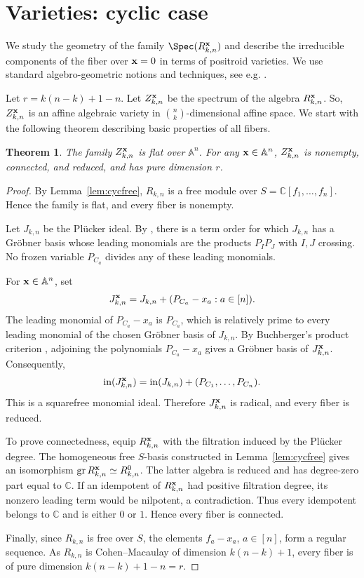 \documentclass[11pt]{amsart}
\numberwithin{equation}{section}
\newtheorem{thm}{Theorem}[section]
\newcommand{\bC}{{\mathbb C}}
\newcommand{\bA}{{\mathbb A}}
\newcommand{\bfx}{{\bf x}}
\begin{document}
\section{Varieties: cyclic case}\label{sec:varcyc}

We study the geometry of the family $\Spec(R_{k,n}^{\bfx})$
and describe the irreducible components of the fiber
over $\bfx=0$ in terms of positroid varieties. We use standard algebro-geometric notions and techniques, see e.g. \cite{V25}.

Let $r = k(n-k)+1-n$. Let $Z_{k,n}^\bfx$ be the spectrum of the algebra $R^\bfx_{k,n}$. So, 
$Z_{k,n}^\bfx$ is an affine algebraic variety in $\binom{n}{k}$-dimensional affine space. 
We start with the following theorem describing basic properties of all fibers.
\begin{thm}
The family $Z_{k,n}^\bfx$ is flat over $\bA^n$. 
For any $\bfx\in\bA^n$, $Z_{k,n}^\bfx$ is nonempty, connected, and reduced, 
and has pure dimension $r$.
\end{thm}

\begin{proof}
By Lemma~\ref{lem:cycfree}, $R_{k,n}$ is a free
module over $S=\bC[f_1,\ldots,f_n]$.
Hence the family is flat, and every fiber
is nonempty.

Let $J_{k,n}$ be the Pl\"ucker ideal.
By \cite{SSW17}, there is a term order for
which $J_{k,n}$ has a Gr\"obner basis
whose leading monomials are the products
$P_IP_J$ with $I,J$ crossing.
No frozen variable $P_{C_a}$ divides
any of these leading monomials.

For $\bfx\in\bA^n$, set
\[
J_{k,n}^{\bfx}
=J_{k,n}+(P_{C_a}-x_a:a\in[n]).
\]
The leading monomial of $P_{C_a}-x_a$
is $P_{C_a}$, which is relatively prime
to every leading monomial of the
chosen Gr\"obner basis of $J_{k,n}$.
By Buchberger's product criterion
\cite[Chapter~2, Section~9]{CLO15},
adjoining the polynomials $P_{C_a}-x_a$
gives a Gr\"obner basis of $J_{k,n}^{\bfx}$.
Consequently,
\[
\operatorname{in}(J_{k,n}^{\bfx})
=
\operatorname{in}(J_{k,n})
+(P_{C_1},\ldots,P_{C_n}).
\]
This is a squarefree monomial ideal.
Therefore $J_{k,n}^{\bfx}$ is radical,
and every fiber is reduced.

To prove connectedness, equip
$R_{k,n}^{\bfx}$ with the filtration
induced by the Pl\"ucker degree.
The homogeneous free $S$-basis
constructed in Lemma~\ref{lem:cycfree}
gives an isomorphism
$\operatorname{gr}R_{k,n}^{\bfx}
\simeq R_{k,n}^{0}$.
The latter algebra is reduced and has
degree-zero part equal to $\bC$.
If an idempotent of $R_{k,n}^{\bfx}$
had positive filtration degree, its
nonzero leading term would be
nilpotent, a contradiction.
Thus every idempotent belongs to
$\bC$ and is either $0$ or $1$.
Hence every fiber is connected.

Finally, since $R_{k,n}$ is free over $S$,
the elements $f_a-x_a$, $a\in[n]$,
form a regular sequence.
As $R_{k,n}$ is Cohen--Macaulay
of dimension $k(n-k)+1$, every fiber
is of pure dimension $k(n-k)+1-n=r$.
\end{proof}
\end{document}
